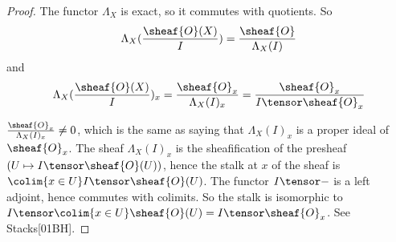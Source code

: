 
\begin{proof}
The functor $\Lambda_X$ is exact, so it commutes with quotients.
So
\[\Lambda_X(\frac{\sheaf{O}(X)}{I}) = \frac{\sheaf{O}}{\Lambda_X(I)}\]
and 
\[\Lambda_X(\frac{\sheaf{O}(X)}{I})_x = \frac{\sheaf{O}_x}{\Lambda_X(I)_x} = \frac{\sheaf{O}_x}{I\tensor \sheaf{O}_x} \]

$\frac{\sheaf{O}_x}{\Lambda_X(I)_x} \neq 0$, which is the same as saying that  $\Lambda_X(I)_x$ is a proper ideal of $\sheaf{O}_x$. 
The sheaf $\Lambda_X(I)_x$ is the sheafification of the presheaf $(U \mapsto I \tensor \sheaf{O}(U))$, hence the stalk at $x$ of the sheaf is 
$\colim{x \in U} I\tensor \sheaf{O}(U)$. The functor $I\tensor -$ is a left adjoint, hence commutes with colimits.
So the stalk is isomorphic to $I\tensor \colim{x\in U} \sheaf{O}(U)= I\tensor \sheaf{O}_x$. See Stacks[01BH].
\end{proof}
